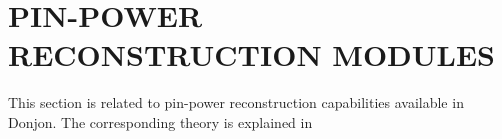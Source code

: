 
\vskip 1.0cm

\vskip 1.0cm

\vskip 1.0cm

\vskip 1.0cm

\vskip 1.0cm

\vskip 1.0cm


\section{PIN-POWER RECONSTRUCTION MODULES}\label{sect:modesc6}

This section is related to pin-power reconstruction capabilities available in Donjon.
The corresponding theory is explained in \cite{Chambon2014,Fliscounakis2011} 



